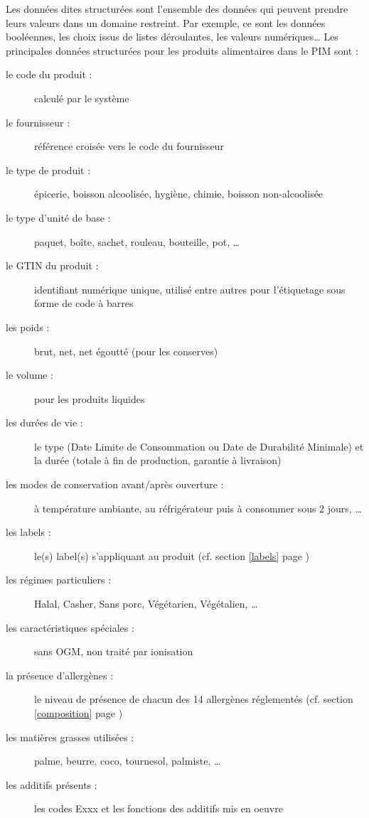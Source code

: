         Les données dites structurées sont l'ensemble des données qui peuvent prendre leurs valeurs dans un domaine restreint.
        Par exemple, ce sont les données booléennes, les choix issus de listes déroulantes, les valeurs numériques\dots
        Les principales données structurées pour les produits alimentaires dans le PIM sont : 
        \begin{description}
            \item[le code du produit :] calculé par le système
            \item[le fournisseur :] référence croisée vers le code du fournisseur
            \item[le type de produit :] épicerie, boisson alcoolisée, hygiène, chimie, boisson non-alcoolisée
            \item[le type d'unité de base :] paquet, boîte, sachet, rouleau, bouteille, pot, \dots
            \item[le GTIN du produit :] identifiant numérique unique, utilisé entre autres pour l'étiquetage sous forme de code à barres~\cite{GS1_GTIN}
            \item[les poids :] brut, net, net égoutté (pour les conserves)
            \item[le volume :] pour les produits liquides
            \item[les durées de vie :] le type (Date Limite de Consommation ou Date de Durabilité Minimale) et la durée (totale à fin de production, garantie à livraison)
            \item[les modes de conservation avant/après ouverture :] à température ambiante, au réfrigérateur puis à consommer sous 2 jours, \dots
            \item[les labels :] le(s) label(s) s'appliquant au produit (cf. section \ref{labels} page \pageref{labels})
            \item[les régimes particuliers :] Halal, Casher, Sans porc, Végétarien, Végétalien, \dots
            \item[les caractéristiques spéciales :] sans OGM, non traité par ionisation
            \item[la présence d'allergènes :] le niveau de présence de chacun des 14 allergènes réglementés (cf. section \ref{composition} page \pageref{composition})
            \item[les matières grasses utilisées :] palme, beurre, coco, tournesol, palmiste, \dots
            \item[les additifs présents :] les codes Exxx et les fonctions des additifs mis en oeuvre~\cite{additifs_regl_eu}\cite{additifs_wiki}

\end{description}
